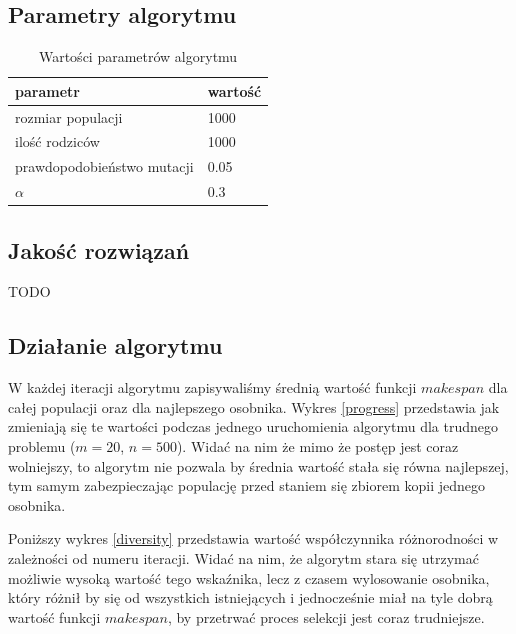 \documentclass[11pt, a4wide]{article}
\begin{document}
\subsection{Parametry algorytmu}

\begin{table}[H]
\caption{Wartości parametrów algorytmu}
\label{parametry}
\begin{center}
\begin{tabular}{|l|l|}
  \hline
  parametr & wartość \\
  \hline
  rozmiar populacji & 1000 \\
  ilość rodziców & 1000 \\
  prawdopodobieństwo mutacji & 0.05 \\
  $\alpha$ & 0.3 \\
  \hline
\end{tabular}
\end{center}
\end{table}


\subsection{Jakość rozwiązań}
TODO

\subsection{Działanie algorytmu}
W każdej iteracji algorytmu zapisywaliśmy średnią wartość funkcji $makespan$ dla całej populacji
oraz dla najlepszego osobnika. Wykres \ref{progress} przedstawia jak zmieniają się te wartości 
podczas jednego uruchomienia algorytmu dla trudnego problemu ($m = 20$, $n = 500$). Widać na nim
że mimo że postęp jest coraz wolniejszy, to algorytm nie pozwala by średnia wartość stała się równa
najlepszej, tym samym zabezpieczając populację przed staniem się zbiorem kopii jednego osobnika.

Poniższy wykres \ref{diversity} przedstawia wartość współczynnika różnorodności w zależności od numeru iteracji.
Widać na nim, że algorytm stara się utrzymać możliwie wysoką wartość tego wskaźnika, lecz z czasem
wylosowanie osobnika, który różnił by się od wszystkich istniejących i jednocześnie miał na tyle
dobrą wartość funkcji $makespan$, by przetrwać proces selekcji jest coraz trudniejsze.
\end{document}
